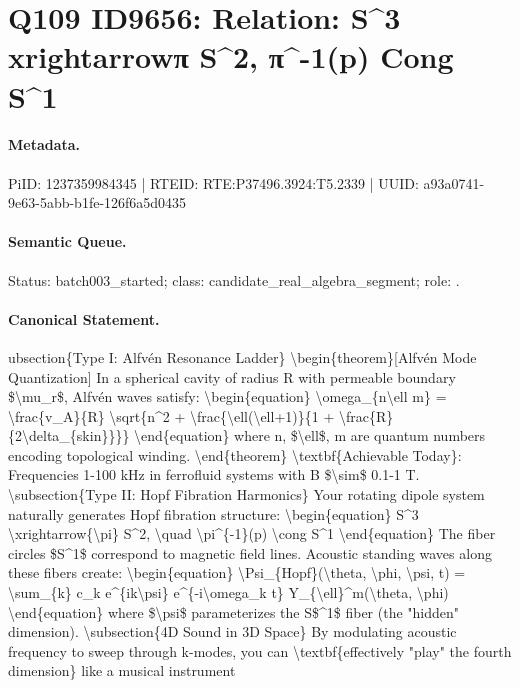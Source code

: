 \section*{Q109 ID9656: Relation: S\textasciicircum{}3 xrightarrowπ S\textasciicircum{}2, π\textasciicircum{}-1(p) Cong S\textasciicircum{}1}
\paragraph{Metadata.}
PiID: 1237359984345 | RTEID: RTE:P37496.3924:T5.2339 | UUID: a93a0741-9e63-5abb-b1fe-126f6a5d0435

\paragraph{Semantic Queue.}
Status: batch003\_started; class: candidate\_real\_algebra\_segment; role: .

\paragraph{Canonical Statement.}
ubsection\{Type I: Alfvén Resonance Ladder\} \textbackslash{}begin\{theorem\}[Alfvén Mode Quantization] In a spherical cavity of radius R with permeable boundary \$\textbackslash{}mu\_r\$, Alfvén waves satisfy: \textbackslash{}begin\{equation\} \textbackslash{}omega\_\{n\textbackslash{}ell m\} = \textbackslash{}frac\{v\_A\}\{R\} \textbackslash{}sqrt\{n\textasciicircum{}2 + \textbackslash{}frac\{\textbackslash{}ell(\textbackslash{}ell+1)\}\{1 + \textbackslash{}frac\{R\}\{2\textbackslash{}delta\_\{skin\}\}\}\} \textbackslash{}end\{equation\} where n, \$\textbackslash{}ell\$, m are quantum numbers encoding topological winding. \textbackslash{}end\{theorem\} \textbackslash{}textbf\{Achievable Today\}: Frequencies 1-100 kHz in ferrofluid systems with B \$\textbackslash{}sim\$ 0.1-1 T. \textbackslash{}subsection\{Type II: Hopf Fibration Harmonics\} Your rotating dipole system naturally generates Hopf fibration structure: \textbackslash{}begin\{equation\} S\textasciicircum{}3 \textbackslash{}xrightarrow\{\textbackslash{}pi\} S\textasciicircum{}2, \textbackslash{}quad \textbackslash{}pi\textasciicircum{}\{-1\}(p) \textbackslash{}cong S\textasciicircum{}1 \textbackslash{}end\{equation\} The fiber circles \$S\textasciicircum{}1\$ correspond to magnetic field lines. Acoustic standing waves along these fibers create: \textbackslash{}begin\{equation\} \textbackslash{}Psi\_\{Hopf\}(\textbackslash{}theta, \textbackslash{}phi, \textbackslash{}psi, t) = \textbackslash{}sum\_\{k\} c\_k e\textasciicircum{}\{ik\textbackslash{}psi\} e\textasciicircum{}\{-i\textbackslash{}omega\_k t\} Y\_\{\textbackslash{}ell\}\textasciicircum{}m(\textbackslash{}theta, \textbackslash{}phi) \textbackslash{}end\{equation\} where \$\textbackslash{}psi\$ parameterizes the S\$\textasciicircum{}1\$ fiber (the "hidden" dimension). \textbackslash{}subsection\{4D Sound in 3D Space\} By modulating acoustic frequency to sweep through k-modes, you can \textbackslash{}textbf\{effectively "play" the fourth dimension\} like a musical instrument

